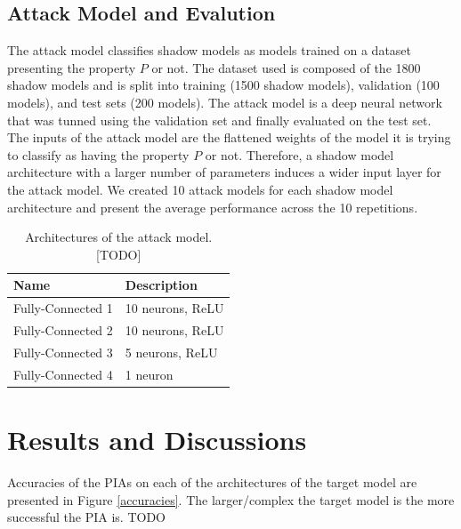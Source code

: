 \documentclass[11pt]{article}
\begin{document}
\subsection{Attack Model and Evalution}
The attack model classifies shadow models as models trained on a dataset presenting the property $P$ or not. The dataset used is composed of the 1800 shadow models and is split into training (1500 shadow models), validation (100 models), and test sets (200 models). The attack model is a deep neural network that was tunned using the validation set and finally evaluated on the test set. The inputs of the attack model are the flattened weights of the model it is trying to classify as having the property $P$ or not. Therefore, a shadow model architecture with a larger number of parameters induces a wider input layer for the attack model. We created 10 attack models for each shadow model architecture and present the average performance across the 10 repetitions.\\

\begin{table}[h!]
\centering
\begin{tabular}{@{}ll@{}}
\toprule
Name              & Description       \\ \midrule
Fully-Connected 1 & 10 neurons, ReLU  \\
Fully-Connected 2 & 10 neurons, ReLU  \\
Fully-Connected 3 & 5 neurons, ReLU  \\
Fully-Connected 4 & 1 neuron          \\ \bottomrule
\end{tabular}
\caption{Architectures of the attack model. [TODO]}
\label{shadow_architecture}
\end{table}

\section{Results and Discussions}
Accuracies of the PIAs on each of the architectures of the target model are presented in Figure \ref{accuracies}. The larger/complex the target model is the more successful the PIA is. TODO
\end{document}
